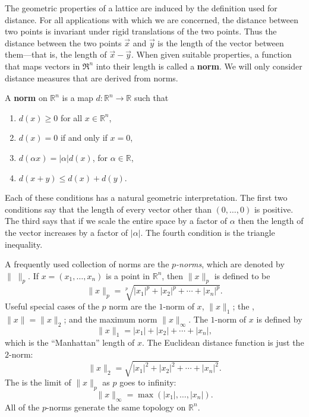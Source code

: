 The geometric properties of a lattice are induced by the definition
used for distance.  For all applications with which we are concerned,
the distance between two points is invariant under rigid translations
of the two points.  Thus the distance between the two points $\vec{x}$
and $\vec{y}$ is the length of the vector between them---that is, the
length of $\vec{x}-\vec{y}$.  When given suitable properties, a function
that maps vectors in $\Re^n$ into their length is called a \textbf{norm}.
We will only consider distance measures that are derived from norms.

\begin{definition}
A {\bf norm} on $\mathbb{R}^{n}$ is a map 
$d: \mathbb{R}^{n} \rightarrow \mathbb{R}$ such that 
\begin{enumerate}
\item $d(x) \ge 0$ for all $x \in \mathbb{R}^{n}$,
\item $d(x) = 0$ if and only if $x = 0$,
\item $d(\alpha x) = |\alpha| d(x)$, for $\alpha \in \mathbb{R}$,
\item $d(x+y) \le d(x) + d(y)$.
\end{enumerate}
\end{definition}

Each of these conditions has a natural geometric interpretation.  The
first two conditions say that the length of every vector other than
$(0, \ldots, 0)$ is positive.  The third says that if we scale the
entire space by a factor of $\alpha$ then the length of the vector
increases by a factor of $|\alpha|$.  The fourth condition is the
triangle inequality.

A frequently used collection of norms are the {\em
$p$-norms}, which are
denoted by $\|\;\|_{p}$.  If $x = (x_{1}, \ldots, x_{n})$ is a point
in $\mathbb{R}^{n}$, then $\|x\|_{p}$ is defined to be
\[
\|x\|_{p} = \sqrt[p]{|x_{1}|^{p} + |x_{2}|^{p} + \cdots + |x_{n}|^{p}}.
\]
Useful special cases of the $p$ norm are the $1$-norm of $x$,
$\|x\|_{1}$; the , $\|x\| = \|x\|_{2}$; and the
maximum norm $\|x\|_{\infty}$.  The $1$-norm of $x$ is defined by
\[
\|x\|_{1} = |x_{1}| + |x_{2}| + \cdots + |x_{n}|,
\]
which is the ``Manhattan'' length of $x$. The
Euclidean distance function is just the $2$-norm:
\[
\|x\|_{2} = \sqrt{|x_{1}|^{2} + |x_{2}|^{2} + \cdots + |x_{n}|^{2}}.
\]
The  is the limit of $\|x\|_{p}$ as $p$ goes to
infinity:
\[
\|x\|_{\infty} = \max (|x_{1}|, \ldots, |x_{n}|).
\]
All of the $p$-norms generate the same topology on $\mathbb{R}^{n}$.


